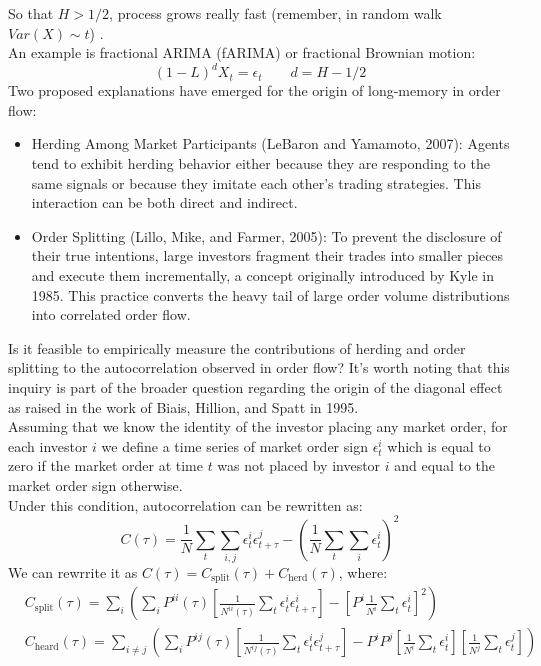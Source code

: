 So that $H >1/2$, process grows really fast (remember, in random walk $Var(X) \sim t$) .\\
An example is fractional ARIMA (fARIMA) or fractional Brownian motion:
\[
(1-L)^d X_t = \epsilon_t \qquad d = H - 1/2
\]
Two proposed explanations have emerged for the origin of long-memory in order flow:
\begin{itemize}
\item Herding Among Market Participants (LeBaron and Yamamoto, 2007): Agents tend to exhibit herding behavior either because they are responding to the same signals or because they imitate each other's trading strategies. This interaction can be both direct and indirect.

\item Order Splitting (Lillo, Mike, and Farmer, 2005): To prevent the disclosure of their true intentions, large investors fragment their trades into smaller pieces and execute them incrementally, a concept originally introduced by Kyle in 1985. This practice converts the heavy tail of large order volume distributions into correlated order flow.
\end{itemize}
Is it feasible to empirically measure the contributions of herding and order splitting to the autocorrelation observed in order flow? It's worth noting that this inquiry is part of the broader question regarding the origin of the diagonal effect as raised in the work of Biais, Hillion, and Spatt in 1995.\\
Assuming that we know the identity of the investor placing any market order, for each investor $i$ we define a time series of market order sign $\epsilon_t^i$ which is equal to zero if the market order at time $t$ was not placed by investor $i$ and equal to the market order sign otherwise.\\
Under this condition, autocorrelation can be rewritten as:
\[
C(\tau) = \frac{1}{N} \sum_t \sum_{i,j} \epsilon^i_t \epsilon^j_{t + \tau} - \left(\frac{1}{N} \sum_t \sum_i \epsilon^i_t\right)^2
\]
We can rewrrite it as $C(\tau) = C_{\text{split}}(\tau) + C_{\text{herd}}(\tau)$, where:
\begin{align*}
	& C_{\text{split}}(\tau) = \sum_i \left(\sum_i P^{ii}(\tau) \left[ \frac{1}{N^{ii}(\tau)} \sum_t \epsilon_t^i\epsilon^i_{t+\tau}\right]- \left[P^i \frac{1}{N^i} \sum_t \epsilon^i_t\right]^2\right)\\
	& C_{\text{heard}}(\tau) = \sum_{i\neq j} \left(\sum_i P^{ij}(\tau) \left[ \frac{1}{N^{ij}(\tau)} \sum_t \epsilon_t^i\epsilon^j_{t+\tau}\right]- P^iP^j\left[ \frac{1}{N^i} \sum_t \epsilon^i_t\right]\left[ \frac{1}{N^j} \sum_t \epsilon^j_t\right]\right)
\end{align*}
